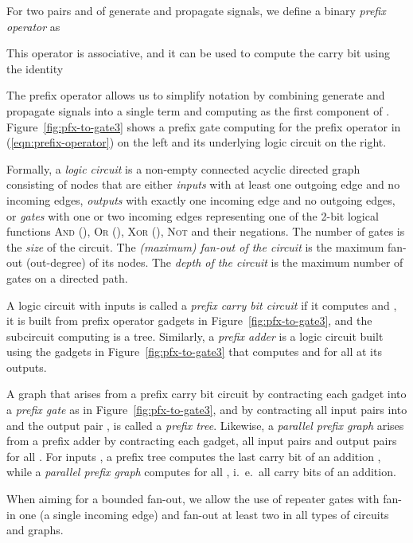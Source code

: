 \documentclass[11pt,final,microtype]{scrartcl}
\theoremstyle{plain}
\theoremstyle{definition}
\theoremstyle{remark}
\newcommand{\tikzfigs}[3]{
  \begin{figure}[!tb]\centering{\resizebox{#2\linewidth}{!}{\begin{tikzpicture}
          
        \end{tikzpicture}}\caption{#1}\label{fig:#3}}\end{figure}}
\begin{document}
For two pairs  and  of generate and propagate
signals, we define a binary \emph{prefix operator} as


This operator is associative, and it can be used to compute the
carry bit  using the identity
 

The prefix operator allows us to simplify notation by combining
generate and propagate signals into a single term  and
computing  as the first component of .  Figure~\ref{fig:pfx-to-gate3} shows a prefix gate computing  for the prefix operator in (\ref{eqn:prefix-operator}) on
the left and its underlying logic circuit on the right.

\tikzfigs{Prefix gate and underlying logic circuit}{0.4}{pfx-to-gate3}

Formally, a \emph{logic circuit} is a non-empty connected acyclic
directed graph consisting of nodes that are either \emph{inputs} with
at least one outgoing edge and no incoming edges, \emph{outputs} with
exactly one incoming edge and no outgoing edges, or \emph{gates} with
one or two incoming edges representing one of the 2-bit logical
functions \textsc{And} (), \textsc{Or} (), \textsc{Xor}
(), \textsc{Not} and their negations.
The number of gates is the \emph{size} of the
circuit. The \emph{(maximum) fan-out of the circuit} is the maximum
fan-out (out-degree) of its nodes. The \emph{depth of the
  circuit} is the maximum number of gates on a directed path.

A logic circuit with inputs  is called 
a \emph{prefix carry bit circuit}  if it  computes   and , 
it is built from prefix operator gadgets in Figure~\ref{fig:pfx-to-gate3}, and the subcircuit computing  is a tree.
Similarly, a \emph{prefix adder}  is a logic circuit built using the gadgets in Figure~\ref{fig:pfx-to-gate3}
that computes    and  for all  at its  outputs.


A graph that arises from a prefix carry bit circuit by contracting
each gadget into a \emph{prefix gate} as in
Figure~\ref{fig:pfx-to-gate3}, and by contracting all input pairs
 into  and the output pair
, is called a \emph{prefix tree}.
Likewise, a \emph{parallel prefix graph} arises from a prefix adder by
contracting each gadget, all input pairs  and output
pairs  for all .
For inputs , a prefix tree computes the last
carry bit of an addition , while a
\emph{parallel prefix graph} computes  for
all , i.\ e.\ all carry bits of an addition.

When aiming for a bounded fan-out, we allow the use of repeater gates
with fan-in one (a single incoming edge) and fan-out at least two in
all types of circuits and graphs.
\end{document}
